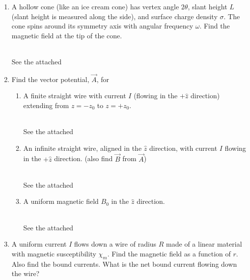 \documentclass[fleqn]{article}
\begin{document}
\begin{enumerate}
    \pagebreak

    \item A hollow cone (like an ice cream cone) has vertex angle $2\theta$, slant height $L$ (slant height is measured along the side), 
    and surface charge density $\sigma$. The cone spins around its symmetry axis with angular frequency $\omega$. Find the magnetic field at 
    the tip of the cone.

      \textcolor{hwColor}{
        \\
        See the attached
        \\
      }

    \item Find the vector potential, $\overrightarrow{A}$, for
    \begin{enumerate}
      \item A finite straight wire with current $I$ (flowing in the $+\hat{z}$ direction)
      extending from $z=-z_0$ to $z=+z_0$.

      \textcolor{hwColor}{
        \\
        See the attached
        \\
      }

      \item An infinite straight wire, aligned in the $\hat{z}$ direction, with current
      $I$ flowing in the $+\hat{z}$ direction. (also find $\overrightarrow{B}$ from $\overrightarrow{A}$)

      \textcolor{hwColor}{
        \\
        See the attached
        \\
      }
      
      \item A uniform magnetic field $B_0$ in the $\hat{z}$ direction.

      \textcolor{hwColor}{
        \\
        See the attached
        \\
      }

    \end{enumerate}


    \item A uniform current $I$ flows down a wire of radius $R$ made of a linear material with magnetic susceptibility $\chi_m$. Find the 
    magnetic field as a function of $r$. Also find the bound currents. What is the net bound current flowing down the wire?


\end{enumerate}
\end{document}
